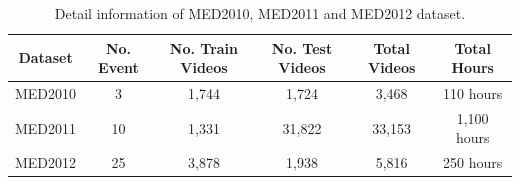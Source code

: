 \begin{table}[h]
		\centering
		\caption{Detail information of MED2010, MED2011 and MED2012 dataset.}
	\begin{tabular}{@{}lccccc@{}}
		\toprule
		\multicolumn{1}{c}{Dataset} & No. Event & No. Train Videos & No. Test Videos & Total Videos & Total Hours \\ \midrule
		MED2010                     & 3         & 1,744            & 1,724           & 3,468        & 110 hours   \\
		MED2011                     & 10        & 1,331            & 31,822          & 33,153       & 1,100 hours \\
		MED2012                     & 25        & 3,878            & 1,938           & 5,816        & 250 hours   \\ \bottomrule
	\end{tabular}
	\label{c2_exp_dataset}
\end{table}

